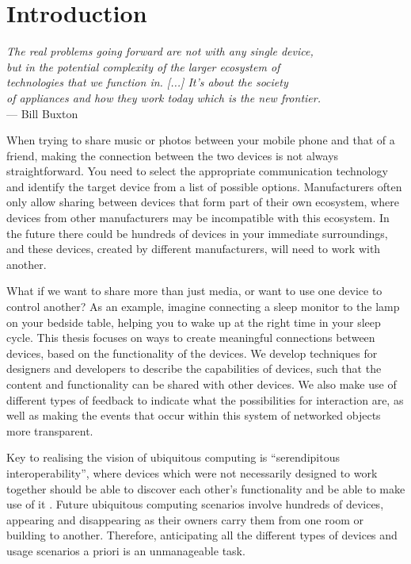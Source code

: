 \chapter{Introduction}
\label{Introduction}

\begin{flushright}{\slshape    
The real problems going forward are not with any single device, \\
but in the potential complexity of the larger ecosystem of \\
technologies that we function in. [...] It's about the society \\
of appliances and how they work today which is the new frontier.} \\ \medskip
    --- Bill Buxton \cite{Buxton2010}
\end{flushright}


When trying to share music or photos between your mobile phone and that of a friend, making the connection between the two devices is not always straightforward. You need to select the appropriate communication technology and identify the target device from a list of possible options. Manufacturers often only allow sharing between devices that form part of their own ecosystem, where devices from other manufacturers may be incompatible with this ecosystem. In the future there could be hundreds of devices in your immediate surroundings, and these devices, created by different manufacturers, will need to work with another.

What if we want to share more than just media, or want to use one device to control another? As an example, imagine connecting a sleep monitor to the lamp on your bedside table, helping you to wake up at the right time in your sleep cycle. This thesis focuses on ways to create meaningful connections between devices, based on the functionality of the devices. We develop techniques for designers and developers to describe the capabilities of devices, such that the content and functionality can be shared with other devices. We also make use of different types of feedback to indicate what the possibilities for interaction are, as well as making the events that occur within this system of networked objects more transparent.

Key to realising the vision of ubiquitous computing \cite{Weiser1991} is ``serendipitous interoperability'', where devices which were not necessarily designed to work together should be able to discover each other's functionality and be able to make use of it \cite{Owl2004}. Future ubiquitous computing scenarios involve hundreds of devices, appearing and disappearing as their owners carry them from one room or building to another. Therefore, anticipating all the different types of devices and usage scenarios a priori is an unmanageable task. 

